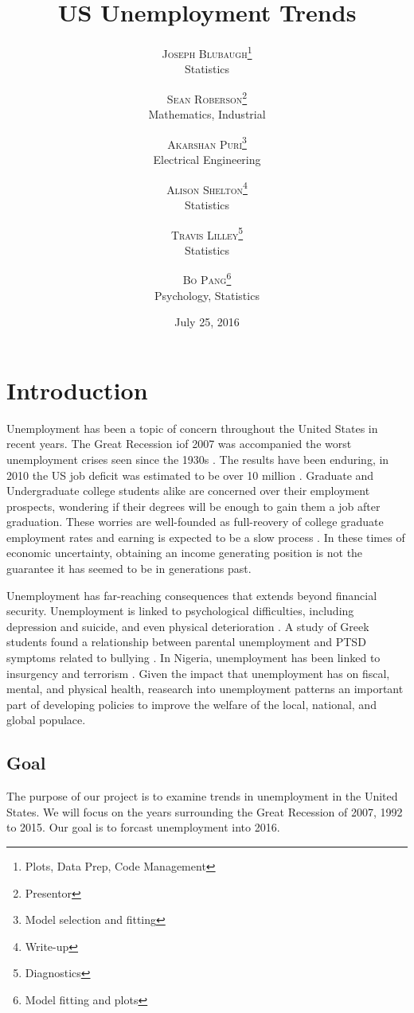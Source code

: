 \documentclass[twoside,twocolumn]{article}
\title{US Unemployment Trends} %
\author{%
\textsc{Joseph Blubaugh}\thanks{Plots, Data Prep, Code Management} \\[1ex] %
\normalsize Statistics\\ %
\and %
\textsc{Sean Roberson}\thanks{Presentor} \\[1ex] %
\normalsize Mathematics, Industrial\\ %
\and 
\textsc{Akarshan Puri}\thanks{Model selection and fitting} \\[1ex] 
\normalsize Electrical Engineering\\ 
\and 
\textsc{Alison Shelton}\thanks{Write-up} \\[1ex] 
\normalsize Statistics\\ 
\and 
\textsc{Travis Lilley}\thanks{Diagnostics} \\[1ex] 
\normalsize Statistics\\ 
\and
\textsc{Bo Pang}\thanks{Model fitting and plots} \\[1 ex]
\normalsize Psychology, Statistics
\vspace*{.5 cm}
}
\date{July 25, 2016 \vspace*{.25 cm}} %
\begin{document}
\maketitle




\section{Introduction}
		Unemployment has been a topic of concern throughout the United States in recent years.  The Great Recession iof 2007 was accompanied the worst unemployment crises seen since the 1930s \citep{wanberg2012individual}.   The results have been enduring, in 2010 the US job deficit was estimated to be over 10 million \citep{katz2010}. Graduate and Undergraduate college students alike are concerned over their employment prospects, wondering if their degrees will be enough to gain them a job after graduation.  These worries are well-founded as full-reovery of college graduate employment rates and earning is expected to be a slow process \cite{carnevale2015hard}.  In these times of economic uncertainty, obtaining an income generating position is not the guarantee it has seemed to be in generations past.
		
Unemployment has far-reaching consequences that extends beyond financial security. Unemployment is linked to psychological difficulties, including depression and suicide, and even physical deterioration \citep{wanberg2012individual, insecure, suicide}. A study of Greek students found a relationship between parental unemployment and PTSD symptoms related to bullying \citep{kanellopoulos2014epa}. In Nigeria, unemployment has been linked to insurgency and terrorism \citep{terrorism}. Given the impact that unemployment has on fiscal, mental, and physical health, reasearch into unemployment patterns an important part of developing policies to improve the welfare of the local, national, and global populace.

\subsection{Goal}
		The purpose of our project is to examine trends in unemployment in the United States. We will focus on the years surrounding the Great Recession of 2007, 1992 to 2015.  Our goal is to forcast unemployment into 2016. 
\end{document}

